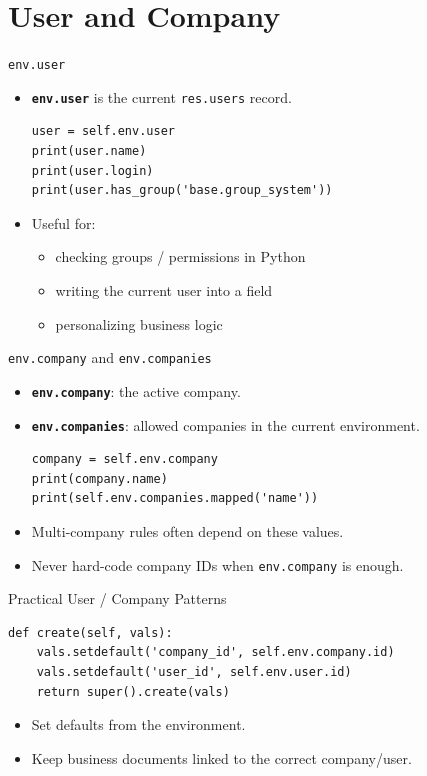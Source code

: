 \section{User and Company}

\begin{frame}[fragile]{\texttt{env.user}}
	\begin{itemize}
		\item \textbf{\texttt{env.user}} is the current \texttt{res.users} record.
\begin{lstlisting}
user = self.env.user
print(user.name)
print(user.login)
print(user.has_group('base.group_system'))
\end{lstlisting}
		\item Useful for:
		\begin{itemize}
			\item checking groups / permissions in Python
			\item writing the current user into a field
			\item personalizing business logic
		\end{itemize}
	\end{itemize}
\end{frame}

\begin{frame}[fragile]{\texttt{env.company} and \texttt{env.companies}}
	\begin{itemize}
		\item \textbf{\texttt{env.company}}: the active company.
		\item \textbf{\texttt{env.companies}}: allowed companies in the current environment.
\begin{lstlisting}
company = self.env.company
print(company.name)
print(self.env.companies.mapped('name'))
\end{lstlisting}
		\item Multi-company rules often depend on these values.
		\item Never hard-code company IDs when \texttt{env.company} is enough.
	\end{itemize}
\end{frame}

\begin{frame}[fragile]{Practical User / Company Patterns}
\begin{lstlisting}
def create(self, vals):
	vals.setdefault('company_id', self.env.company.id)
	vals.setdefault('user_id', self.env.user.id)
	return super().create(vals)
\end{lstlisting}
	\begin{itemize}
		\item Set defaults from the environment.
		\item Keep business documents linked to the correct company/user.
	\end{itemize}
\end{frame}
